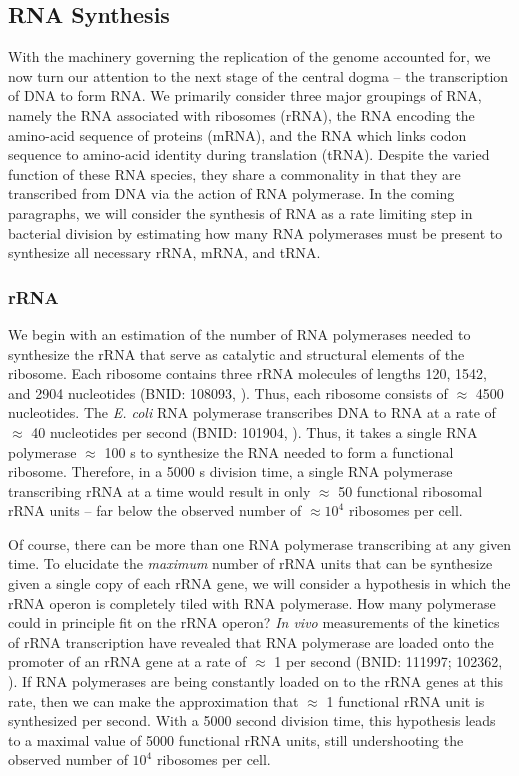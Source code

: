 \subsection{RNA Synthesis}
With the machinery governing the replication of the genome accounted for, we
now turn our attention to the next stage of the central dogma -- the
transcription of DNA to form RNA. We primarily consider three major groupings
of RNA, namely the RNA associated with ribosomes (rRNA), the RNA encoding the
amino-acid sequence of proteins (mRNA), and the RNA which links codon
sequence to amino-acid identity during translation (tRNA). Despite the varied
function of these RNA species, they share a commonality in that they are
transcribed from DNA via the action of RNA polymerase. In the coming
paragraphs, we will consider the synthesis of RNA as a rate limiting step in
bacterial division by estimating how many RNA polymerases must be present to
synthesize all necessary rRNA, mRNA, and tRNA.

\subsubsection{rRNA}
We begin with an estimation of the number of RNA polymerases needed to
synthesize the rRNA that serve as catalytic and structural elements of the
ribosome. Each ribosome contains three rRNA molecules of lengths 120, 1542,
and 2904 nucleotides (BNID: 108093, \cite{milo2010}). Thus, each ribosome
consists of $\approx$ 4500 nucleotides. The \textit{E. coli} RNA polymerase
transcribes DNA to RNA at a rate of $\approx$ 40 nucleotides per second
(BNID: 101904, \cite{milo2010}). Thus, it takes a single RNA polymerase
$\approx$ 100 s to synthesize the RNA needed to form a functional ribosome.
Therefore, in a 5000 s division time, a single RNA polymerase transcribing
rRNA at a time would result in only $\approx$ 50 functional ribosomal rRNA
units -- far below the observed number of $\approx 10^4$ ribosomes per cell.

Of course, there can be more than one RNA polymerase transcribing at any
given time. To elucidate the \textit{maximum} number of rRNA units that can
be synthesize given a single copy of each rRNA gene, we will consider a
hypothesis in which the rRNA operon is completely tiled with RNA polymerase.
How many polymerase could in principle fit on the rRNA operon? \textit{In
vivo} measurements of the kinetics of rRNA transcription have revealed that
RNA polymerase are loaded onto the promoter of an rRNA gene at a rate of
$\approx$ 1 per second (BNID: 111997; 102362, \cite{milo2010}). If RNA
polymerases are being constantly loaded on to the rRNA genes at this rate,
then we can make the approximation that $\approx$ 1 functional rRNA unit is
synthesized per second. With a 5000 second division time, this hypothesis
leads to a maximal value of 5000 functional rRNA units, still undershooting
the observed number of $10^4$ ribosomes per cell.

